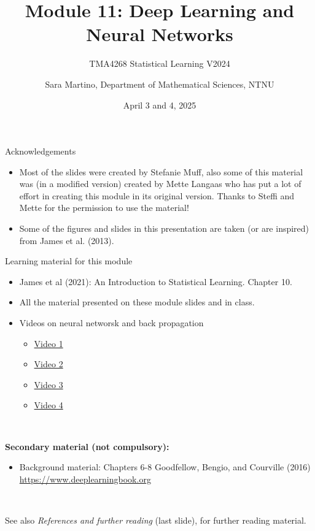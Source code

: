 \documentclass[
  10pt,
  ignorenonframetext,
  twocolumn]{beamer}
\title{Module 11: Deep Learning and Neural Networks}
\subtitle{TMA4268 Statistical Learning V2024}
\author{Sara Martino, Department of Mathematical Sciences, NTNU}
\date{April 3 and 4, 2025}
\providecommand{\tightlist}{%
  \setlength{\itemsep}{0pt}\setlength{\parskip}{0pt}}
\begin{document}
\frame{\titlepage}

\begin{frame}
\end{frame}

\begin{frame}{Acknowledgements}
\label{acknowledgements}
\(~\)

\begin{itemize}
\item
  Most of the slides were created by Stefanie Muff, also some of this
  material was (in a modified version) created by Mette Langaas who has
  put a lot of effort in creating this module in its original version.
  Thanks to Steffi and Mette for the permission to use the material!
\item
  Some of the figures and slides in this presentation are taken (or are
  inspired) from James et al. (2013).
\end{itemize}
\end{frame}

\begin{frame}
\begin{block}{Learning material for this module}
\label{learning-material-for-this-module}
\vspace{2mm}

\begin{itemize}
\item
  James et al (2021): An Introduction to Statistical Learning. Chapter
  10.
\item
  All the material presented on these module slides and in class.
\item
  Videos on neural networsk and back propagation

  \begin{itemize}
  \tightlist
  \item
    \href{https://www.youtube.com/watch?v=aircAruvnKk}{Video 1}
  \item
    \href{https://www.youtube.com/watch?v=IHZwWFHWa-w}{Video 2}
  \item
    \href{https://www.youtube.com/watch?v=Ilg3gGewQ5U}{Video 3}
  \item
    \href{https://www.youtube.com/watch?v=tIeHLnjs5U8}{Video 4}
  \end{itemize}
\end{itemize}

\(~\)

\textbf{Secondary material (not compulsory):}

\vspace{2mm}

\begin{itemize}
\tightlist
\item
  Background material: Chapters 6-8 Goodfellow, Bengio, and Courville
  (2016) \url{https://www.deeplearningbook.org}
\end{itemize}

\(~\)

See also \emph{References and further reading} (last slide), for further
reading material.
\end{block}
\end{frame}
\end{document}
